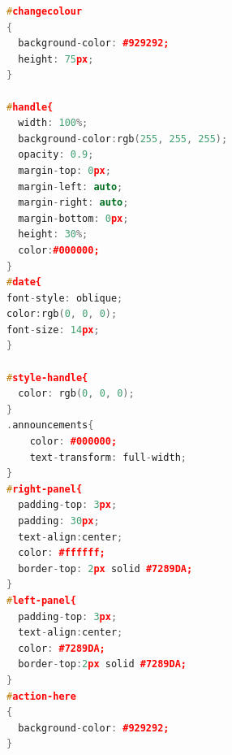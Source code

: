 \documentclass{fisatproject}
\begin{document}
\begin{appendices}
\begin{lstlisting}[language=c++]
#changecolour
{
  background-color: #929292;
  height: 75px;
}

#handle{
  width: 100%;
  background-color:rgb(255, 255, 255);
  opacity: 0.9;
  margin-top: 0px;
  margin-left: auto;
  margin-right: auto;
  margin-bottom: 0px;
  height: 30%;
  color:#000000;
}
#date{
font-style: oblique;
color:rgb(0, 0, 0);
font-size: 14px;
}

#style-handle{
  color: rgb(0, 0, 0);
}
.announcements{
    color: #000000;
    text-transform: full-width;
}
#right-panel{
  padding-top: 3px;
  padding: 30px;
  text-align:center;
  color: #ffffff;
  border-top: 2px solid #7289DA;
}
#left-panel{
  padding-top: 3px;
  text-align:center;
  color: #7289DA;
  border-top:2px solid #7289DA;
}
#action-here
{
  background-color: #929292;
}

\end{lstlisting}

\end{appendices}
\end{document}
